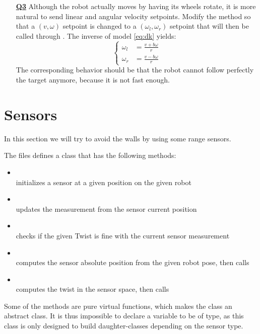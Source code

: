 \documentclass{ecnreport}
\begin{document}
\begin{itemize}
\medskip\item[\textbf{\underline{Q3}}] Although the robot actually moves by having its wheels rotate, 
it is more natural to send linear and angular velocity setpoints. Modify the 
 method so that a $(v,\omega)$ setpoint is changed to a $(\omega_l,\omega_r)$ setpoint that will then be called through .
 The inverse of model \eqref{eq:dk} yields:
\begin{equation}
\left\{\begin{array}{ll}
\omega_l &= \displaystyle \frac{v + b\omega}{r} \\
\omega_r &= \displaystyle \frac{v - b\omega}{r}
\end{array}\right.
\end{equation} 
The corresponding behavior should be that the robot cannot follow perfectly the target anymore, because it is not fast enough.
\end{itemize}

%  
\newpage

\section{Sensors}

In this section we will try to avoid the walls by using some range sensors.

The  files defines a  class that has the following methods:
\begin{itemize}
\item {}\\initializes a sensor at a given position on the given robot
\item {}\\ updates the measurement from the sensor current position
\item {}\\ checks if the given Twist is fine with the current sensor measurement
\item {}\\ computes the sensor absolute position from the given robot pose, then calls 
\item {}\\ computes the twist in the sensor space, then calls 
\end{itemize}
Some of the methods are pure virtual functions, which makes the  class an abstract class.
It is thus impossible to declare a variable to be of  type, as this class is only designed to build daughter-classes depending on the sensor type.
\end{document}
